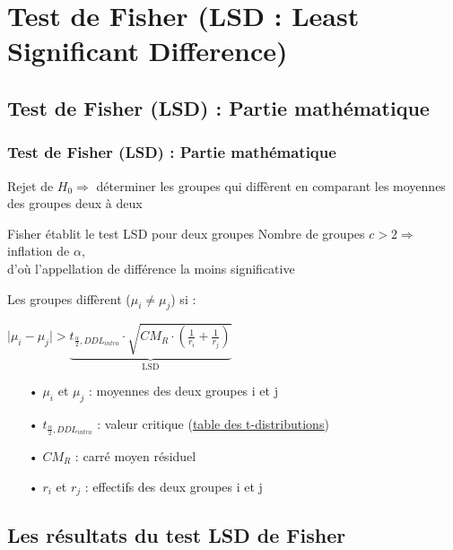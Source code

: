 \documentclass{beamer}
\begin{document}
\section{Test de Fisher (LSD : Least Significant Difference)}

\subsection{Test de Fisher (LSD) : Partie mathématique}
\begin{frame}
	\frametitle{Test de Fisher (LSD) : Partie mathématique}
	
	Rejet de $H_0 \Rightarrow$ déterminer les groupes qui diffèrent en comparant les moyennes des groupes deux à deux \\
	
\begin{alertblock}{Fisher établit le test LSD pour deux groupes}
Nombre de groupes $ c > 2 \Rightarrow $ inflation de $\alpha$, \\
d'où l'appellation de différence la moins significative  
\end{alertblock}	
	
	\begin{block}{Les groupes diffèrent ($\mu_i \neq \mu_j$) si :}
		\begin{center}
		$\mid{\mu_i-\mu_j}\mid > \underbrace{t_{\frac{\alpha}{2},DDL_{intra}} \cdot \sqrt{CM_R \cdot (\frac{1}{r_i}+\frac{1}{r_j})}}_{\text{LSD}}$
		\end{center}	
	\end{block}
	\begin{itemize}
		\item[•] $\mu_i$ et $\mu_j$ : moyennes des deux groupes i et j
		\item[•] $t_{\frac{\alpha}{2},DDL_{intra}}$ : valeur critique (\href{http://www.statisticshowto.com/tables/t-distribution-table/}{\underline{table des t-distributions}})
		\item[•] $CM_R$ : carré moyen résiduel
		\item[•] $r_i$ et $r_j$ : effectifs des deux groupes i et j
	\end{itemize}
\end{frame}

\subsection{Les résultats du test LSD de Fisher}
\end{document}
